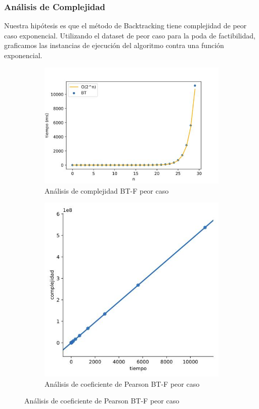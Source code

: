 \documentclass[10pt,a4paper]{article}
\begin{document}
\subsubsection{Análisis de Complejidad}
Nuestra hipótesis es que el método de Backtracking tiene complejidad de peor caso exponencial. Utilizando el dataset de peor caso para la poda de factibilidad, graficamos las instancias de ejecución del algoritmo contra una función exponencial.
\newline
\begin{figure}[h!]
\begin{subfigure}{0.4\linewidth}
	\centering
		\includegraphics[scale=0.30]{img/bt-complejidad-peor-caso.jpg}
		\caption{Análisis de complejidad BT-F peor caso}
		\label{fig:bt-complejidad-pero-caso}
\end{subfigure}
\begin{subfigure}{0.4\linewidth}
	\centering
		\includegraphics[scale=0.30]{img/bt-correlacion-peor-caso.jpg}
		\caption{Análisis de coeficiente de Pearson BT-F peor caso}
		\label{fig:bt-correlacion-peor-caso}
\end{subfigure}
\end{figure}
\end{document}
